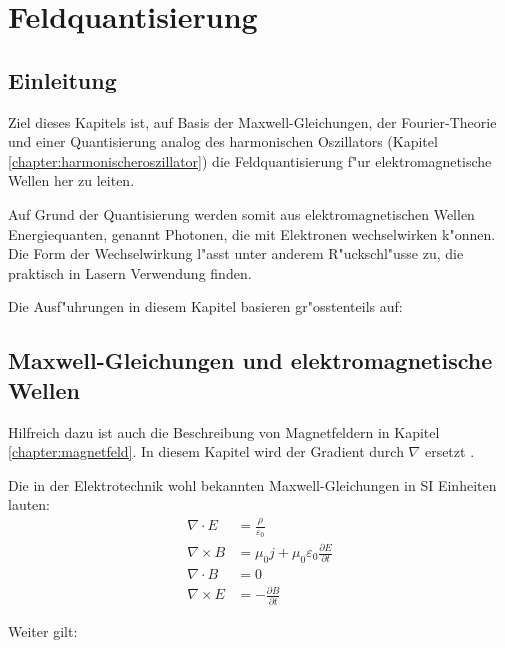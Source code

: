 \chapter{Feldquantisierung\label{chapter:feldquantisierung}}
\begin{refsection}

\printbibliography[heading=subbibliography]
\end{refsection}

\section{Einleitung}

Ziel dieses Kapitels ist, auf Basis der Maxwell-Gleichungen, der Fourier-Theorie und einer Quantisierung analog des harmonischen Oszillators (Kapitel \ref{chapter:harmonischeroszillator}) die Feldquantisierung f"ur elektromagnetische Wellen her zu leiten.

Auf Grund der Quantisierung werden somit aus elektromagnetischen Wellen Energiequanten, genannt Photonen, die mit Elektronen wechselwirken k"onnen. Die Form der Wechselwirkung l"asst unter anderem R"uckschl"usse zu, die praktisch in Lasern Verwendung finden.

Die Ausf"uhrungen in diesem Kapitel basieren gr"osstenteils auf: \cite{fq:aqm}

\section{Maxwell-Gleichungen und elektromagnetische Wellen}

Hilfreich dazu ist auch die Beschreibung von Magnetfeldern in Kapitel \ref{chapter:magnetfeld}. In diesem Kapitel wird der Gradient durch $\nabla$ ersetzt \cite{fq:nabla}.

Die in der Elektrotechnik wohl bekannten Maxwell-Gleichungen in SI Einheiten lauten:
\begin{align}
\nabla\cdot E &= \frac{\rho}{\varepsilon_0} \label{fq:maxwell_1}\\
\nabla\times B &= \mu_0 j  + \mu_0 \varepsilon_0\frac{\partial E}{\partial t} \label{fq:maxwell_2}\\
\nabla\cdot B &=0 \label{fq:maxwell_3}\\
\nabla\times E &= -\frac{\partial B }{\partial t} \label{fq:maxwell_4}
\end{align}

Weiter gilt:


